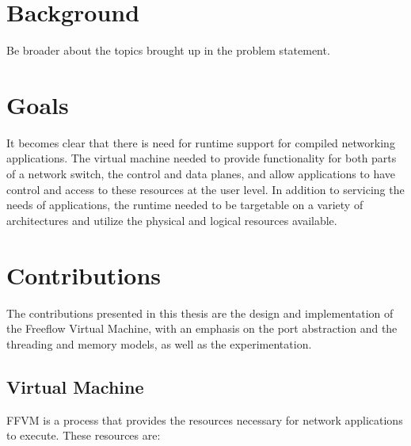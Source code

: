 
\section{Background}
Be broader about the topics brought up in the problem statement.

\section{Goals}
It becomes clear that there is need for runtime support for compiled
networking applications. The virtual machine needed to provide functionality
for both parts of a network switch, the control and data planes, and allow
applications to have control and access to these resources at the user level.
In addition to servicing the needs of applications, the runtime needed to be
targetable on a variety of architectures and utilize the physical and logical
resources available.

\section{Contributions}
The contributions presented in this thesis are the design and implementation of
the Freeflow Virtual Machine, with an emphasis on the port abstraction and the
threading and memory models, as well as the experimentation.

\subsection{Virtual Machine}
FFVM is a process that provides the resources necessary for network
applications to execute. These resources are:

